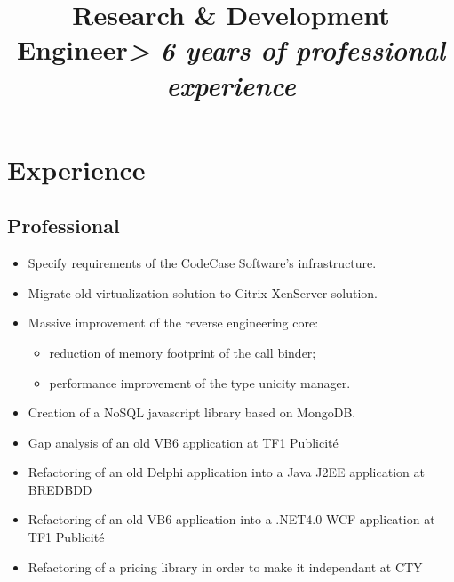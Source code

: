 \documentclass[11pt, a4paper]{moderncv}
\title{\textbf{Research \& Development Engineer}\newline \Large{\textit{> 6 years of professional experience}}}
\begin{document}
\maketitle

\section{Experience}
\subsection{Professional}
{
  \begin{itemize}
    \renewcommand{\labelitemi}{$\bullet$  }
    \item Specify requirements of the CodeCase Software's infrastructure.
    \item Migrate old virtualization solution to Citrix XenServer solution.
  \end{itemize}
}
{
  \begin{itemize}
    \renewcommand{\labelitemi}{$\bullet$  }
    \item Massive improvement of the reverse engineering core:
      \begin{itemize}
        \item reduction of memory footprint of the call binder;
        \item performance improvement of the type unicity manager.
      \end{itemize}
    \item Creation of a NoSQL javascript library based on MongoDB.
  \end{itemize}
}
{
  \begin{itemize}
    \renewcommand{\labelitemi}{$\bullet$  }
    \item Gap analysis of an old VB6 application at TF1 Publicit\'e
    \item Refactoring of an old Delphi application into a Java J2EE application at BREDBDD
    \item Refactoring of an old VB6 application into a .NET4.0 WCF application at TF1 Publicit\'e
    \item Refactoring of a pricing library in order to make it independant at CTY
  \end{itemize}
}
\end{document}
